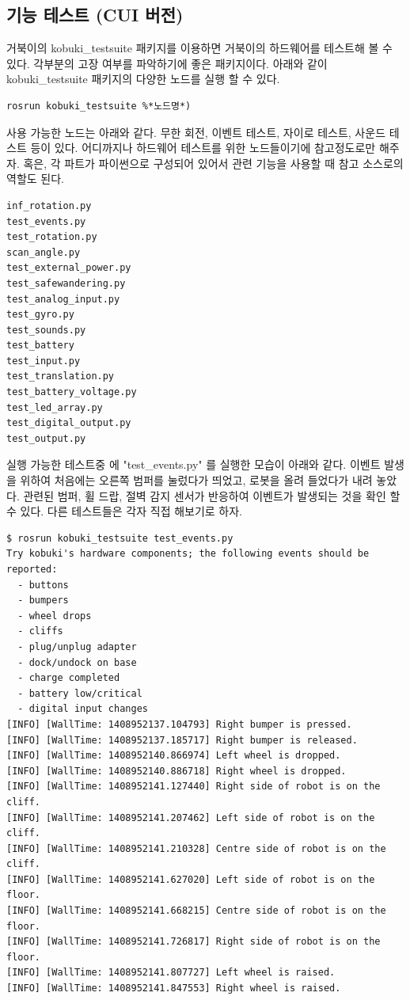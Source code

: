 \subsection{기능 테스트 (CUI 버전)}

거북이의 kobuki\_testsuite 패키지를 이용하면 거북이의 하드웨어를 테스트해 볼 수 있다. 각부분의 고장 여부를 파악하기에 좋은 패키지이다. 아래와 같이 kobuki\_testsuite 패키지의 다양한 노드를 실행 할 수 있다. 

\vspace{\baselineskip}
\begin{lstlisting}[language=ROS]
rosrun kobuki_testsuite %*노드명*)
\end{lstlisting}

사용 가능한 노드는 아래와 같다. 무한 회전, 이벤트 테스트, 자이로 테스트, 사운드 테스트 등이 있다. 어디까지나 하드웨어 테스트를 위한 노드들이기에 참고정도로만 해주자. 혹은, 각 파트가 파이썬으로 구성되어 있어서 관련 기능을 사용할 때 참고 소스로의 역할도 된다.

\vspace{\baselineskip}
\begin{lstlisting}[language=ROS]
inf_rotation.py
test_events.py
test_rotation.py
scan_angle.py
test_external_power.py
test_safewandering.py
test_analog_input.py
test_gyro.py
test_sounds.py
test_battery
test_input.py
test_translation.py
test_battery_voltage.py
test_led_array.py
test_digital_output.py
test_output.py 
\end{lstlisting}


실행 가능한 테스트중 에 "test\_events.py" 를 실행한 모습이 아래와 같다. 이벤트 발생을 위하여 처음에는 오른쪽 범퍼를 눌렀다가 띄었고, 로봇을 올려 들었다가 내려 놓았다. 관련된 범퍼, 휠 드랍, 절벽 감지 센서가 반응하여 이벤트가 발생되는 것을 확인 할 수 있다. 다른 테스트들은 각자 직접 해보기로 하자.

\vspace{\baselineskip}
\begin{lstlisting}[language=ROS]
$ rosrun kobuki_testsuite test_events.py
Try kobuki's hardware components; the following events should be reported:
  - buttons
  - bumpers
  - wheel drops
  - cliffs
  - plug/unplug adapter
  - dock/undock on base
  - charge completed
  - battery low/critical
  - digital input changes
[INFO] [WallTime: 1408952137.104793] Right bumper is pressed.
[INFO] [WallTime: 1408952137.185717] Right bumper is released.
[INFO] [WallTime: 1408952140.866974] Left wheel is dropped.
[INFO] [WallTime: 1408952140.886718] Right wheel is dropped.
[INFO] [WallTime: 1408952141.127440] Right side of robot is on the cliff.
[INFO] [WallTime: 1408952141.207462] Left side of robot is on the cliff.
[INFO] [WallTime: 1408952141.210328] Centre side of robot is on the cliff.
[INFO] [WallTime: 1408952141.627020] Left side of robot is on the floor.
[INFO] [WallTime: 1408952141.668215] Centre side of robot is on the floor.
[INFO] [WallTime: 1408952141.726817] Right side of robot is on the floor.
[INFO] [WallTime: 1408952141.807727] Left wheel is raised.
[INFO] [WallTime: 1408952141.847553] Right wheel is raised.
\end{lstlisting}

